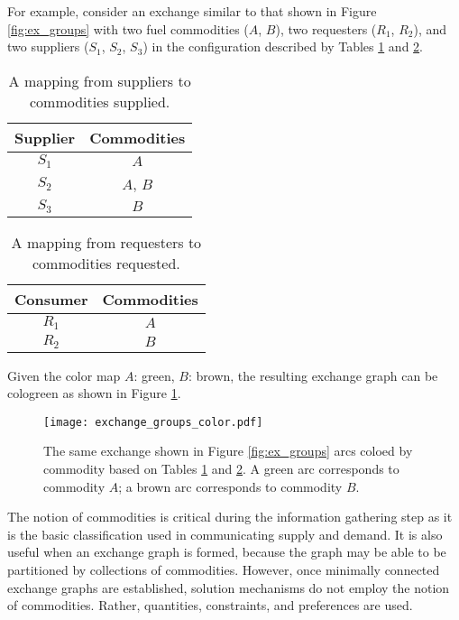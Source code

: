 For example, consider an exchange similar to that shown in Figure
\ref{fig:ex_groups} with two fuel commodities ($A$, $B$), two requesters ($R_1$,
$R_2$), and two suppliers ($S_1$, $S_2$, $S_3$) in the configuration described
by Tables \ref{tbl:ex_sup} and \ref{tbl:ex_req}.

\begin{table}[h]
\centering
\begin{tabular}{c|c}
Supplier & Commodities \\ \hline
$S_1$             & $A$         \\
$S_2$             & $A$, $B$    \\
$S_3$             & $B$         \\
\end{tabular}
\caption{A mapping from suppliers to commodities supplied.}
\label{tbl:ex_sup}
\end{table}

\begin{table}[h]
\centering
\begin{tabular}{c|c}
Consumer & Commodities \\ \hline
$R_1$             & $A$         \\
$R_2$             & $B$        
\end{tabular}
\caption{A mapping from requesters to commodities requested.}
\label{tbl:ex_req}
\end{table}

Given the color map $A$: green, $B$: brown, the resulting exchange
graph can be cologreen as shown in Figure \ref{fig:ex_groups_color}.

\begin{figure}
  \begin{center}
    \texttt{[image: exchange\_groups\_color.pdf]}
    \caption{The same exchange shown in Figure \ref{fig:ex_groups} arcs coloed
      by commodity based on Tables \ref{tbl:ex_sup} and \ref{tbl:ex_req}. A green
      arc corresponds to commodity $A$; a brown arc corresponds to commodity
      $B$.}
    \label{fig:ex_groups_color}
  \end{center}
\end{figure}

The notion of commodities is critical during the information gathering step as
it is the basic classification used in communicating supply and demand. It is
also useful when an exchange graph is formed, because the graph may be able to
be partitioned by collections of commodities. However, once minimally connected
exchange graphs are established, solution mechanisms do not employ the notion of
commodities. Rather, quantities, constraints, and preferences are used.

